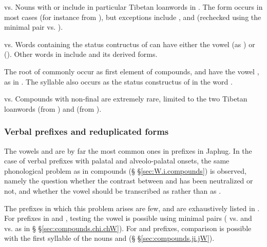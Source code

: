 \begin{paragraph}{ vs.  } \label{sec:compounds.chi.chW}
	Nouns with  or  include in particular Tibetan loanwords in . The form  occurs in most cases (for instance  from ), but exceptions include ,  and  (rechecked using the minimal pair  vs. ).
\end{paragraph}
\begin{paragraph}{ vs.  }
	Words containing the status contructus of  can have either the vowel  (as ) or  (). Other words in   include  and its derived forms.
	
	The root of  commonly occur as first element of compounds, and have the vowel , as in . The syllable  also occurs as the status constructus of  in the word .
	
\end{paragraph}
\begin{paragraph}{ vs.  } \label{sec:compounds.ji.jW}
	Compounds with non-final   are extremely rare, limited to the two Tibetan loanwords  (from ) and  (from ).
\end{paragraph}


\subsubsection{Verbal prefixes and reduplicated forms}
The vowels  and  are by far the most common ones in prefixes in Japhug. In the case of verbal prefixes with palatal and alveolo-palatal onsets, the same phonological problem as in compounds (§ §\ref{sec:W.i.compounds}) is observed, namely the question whether the contrast between  and  has been neutralized or not, and whether the vowel should be transcribed as  rather than as .

The prefixes in which this problem arises are few, and are exhaustively listed in . For prefixes in  and , testing the vowel is possible using minimal pairs ( vs.  and  vs.  as in § §\ref{sec:compounds.chi.chW}). For  and  prefixes, comparison is possible with the first syllable of the nouns  and  (§ §\ref{sec:compounds.ji.jW}). 


